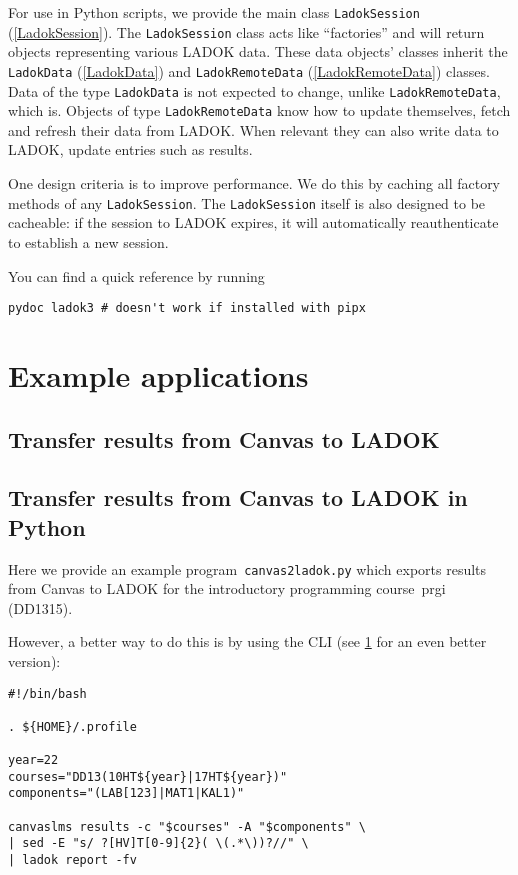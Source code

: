 \documentclass[a4paper,oneside]{memoir}
\begin{document}
For use in Python scripts,
we provide the main class \texttt{LadokSession} (\cref{LadokSession}).
The \texttt{LadokSession} class acts like \enquote{factories} and will return 
objects representing various LADOK data.
These data objects' classes inherit the \texttt{LadokData} (\cref{LadokData}) 
and \texttt{LadokRemoteData} (\cref{LadokRemoteData}) classes.
Data of the type \texttt{LadokData} is not expected to change, unlike 
\texttt{LadokRemoteData}, which is.
Objects of type \texttt{LadokRemoteData} know how to update themselves, \ie fetch 
and refresh their data from LADOK.
When relevant they can also write data to LADOK, \ie update entries such as 
results.

One design criteria is to improve performance.
We do this by caching all factory methods of any \texttt{LadokSession}.
The \texttt{LadokSession} itself is also designed to be cacheable: if the session to 
LADOK expires, it will automatically reauthenticate to establish a new session.

You can find a quick reference by running
\begin{verbatim}
pydoc ladok3 # doesn't work if installed with pipx
\end{verbatim}



\part{Example applications}

\chapter{Transfer results from Canvas to LADOK}\label{SomeScripts}



\chapter{Transfer results from Canvas to LADOK in Python}

Here we provide an example program~\texttt{canvas2ladok.py} which exports 
results from Canvas to LADOK for the introductory programming course~prgi 
(DD1315).

However, a better way to do this is by using the CLI
(see \cref{SomeScripts} for an even better version):
\begin{verbatim}
#!/bin/bash

. ${HOME}/.profile

year=22
courses="DD13(10HT${year}|17HT${year})"
components="(LAB[123]|MAT1|KAL1)"

canvaslms results -c "$courses" -A "$components" \
| sed -E "s/ ?[HV]T[0-9]{2}( \(.*\))?//" \
| ladok report -fv
\end{verbatim}
\end{document}
